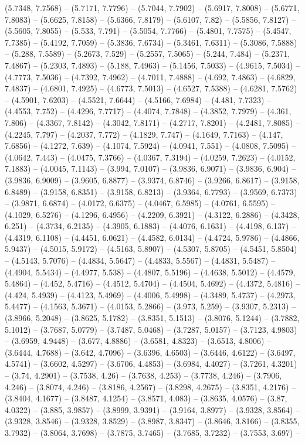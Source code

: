 (5.7348, 7.7568) -- (5.7171, 7.7796) -- (5.7044, 7.7902) -- (5.6917, 7.8008) -- (5.6771, 7.8083) -- (5.6625, 7.8158) -- (5.6366, 7.8179) -- (5.6107, 7.82) -- (5.5856, 7.8127) -- (5.5605, 7.8055) -- (5.533, 7.791) -- (5.5054, 7.7766) -- (5.4801, 7.7575) -- (5.4547, 7.7385) -- (5.4192, 7.7059) -- (5.3836, 7.6734) -- (5.3461, 7.6311) -- (5.3086, 7.5888) -- (5.288, 7.5589) -- (5.2673, 7.529) -- (5.2557, 7.5065) -- (5.244, 7.484) -- (5.2371, 7.4867) -- (5.2303, 7.4893) -- (5.188, 7.4963) -- (5.1456, 7.5033) -- (4.9615, 7.5034) -- (4.7773, 7.5036) -- (4.7392, 7.4962) -- (4.7011, 7.4888) -- (4.692, 7.4863) -- (4.6829, 7.4837) -- (4.6801, 7.4925) -- (4.6773, 7.5013) -- (4.6527, 7.5388) -- (4.6281, 7.5762) -- (4.5901, 7.6203) -- (4.5521, 7.6644) -- (4.5166, 7.6984) -- (4.481, 7.7323) -- (4.4553, 7.752) -- (4.4296, 7.7717) -- (4.4074, 7.7848) -- (4.3852, 7.7979) -- (4.361, 7.806) -- (4.3367, 7.8142) -- (4.3042, 7.8171) -- (4.2717, 7.8201) -- (4.2481, 7.8085) -- (4.2245, 7.797) -- (4.2037, 7.772) -- (4.1829, 7.747) -- (4.1649, 7.7163) -- (4.147, 7.6856) -- (4.1272, 7.639) -- (4.1074, 7.5924) -- (4.0941, 7.551) -- (4.0808, 7.5095) -- (4.0642, 7.443) -- (4.0475, 7.3766) -- (4.0367, 7.3194) -- (4.0259, 7.2623) -- (4.0152, 7.1883) -- (4.0045, 7.1143) -- (3.994, 7.0107) -- (3.9836, 6.9071) -- (3.9836, 6.904) -- (3.9836, 6.9009) -- (3.9605, 6.8877) -- (3.9374, 6.8746) -- (3.9266, 6.8617) -- (3.9158, 6.8489) -- (3.9158, 6.8351) -- (3.9158, 6.8213) -- (3.9364, 6.7793) -- (3.9569, 6.7373) -- (3.9871, 6.6874) -- (4.0172, 6.6375) -- (4.0467, 6.5985) -- (4.0761, 6.5595) -- (4.1029, 6.5276) -- (4.1296, 6.4956) -- (4.2209, 6.3921) -- (4.3122, 6.2886) -- (4.3428, 6.251) -- (4.3734, 6.2135) -- (4.3905, 6.1883) -- (4.4076, 6.1631) -- (4.4198, 6.137) -- (4.4319, 6.1108) -- (4.4451, 6.0621) -- (4.4582, 6.0134) -- (4.4724, 5.9786) -- (4.4866, 5.9437) -- (4.5015, 5.9172) -- (4.5163, 5.8907) -- (4.5307, 5.8705) -- (4.5451, 5.8504) -- (4.5143, 5.7076) -- (4.4834, 5.5647) -- (4.4833, 5.5567) -- (4.4831, 5.5487) -- (4.4904, 5.5434) -- (4.4977, 5.538) -- (4.4807, 5.5196) -- (4.4638, 5.5012) -- (4.4579, 5.4864) -- (4.452, 5.4716) -- (4.4512, 5.4704) -- (4.4504, 5.4692) -- (4.4372, 5.4816) -- (4.424, 5.4939) -- (4.4123, 5.4969) -- (4.4006, 5.4998) -- (4.3489, 5.4737) -- (4.2973, 5.4477) -- (4.1563, 5.3671) -- (4.0153, 5.2866) -- (3.973, 5.259) -- (3.9307, 5.2313) -- (3.8966, 5.2048) -- (3.8625, 5.1782) -- (3.8351, 5.1513) -- (3.8076, 5.1244) -- (3.7882, 5.1012) -- (3.7687, 5.0779) -- (3.7487, 5.0468) -- (3.7287, 5.0157) -- (3.7123, 4.9803) -- (3.6959, 4.9448) -- (3.677, 4.8886) -- (3.6581, 4.8323) -- (3.6513, 4.8006) -- (3.6444, 4.7688) -- (3.642, 4.7096) -- (3.6396, 4.6503) -- (3.6446, 4.6122) -- (3.6497, 4.5741) -- (3.6602, 4.5297) -- (3.6706, 4.4853) -- (3.6984, 4.4027) -- (3.7261, 4.3201) -- (3.74, 4.2901) -- (3.7538, 4.26) -- (3.7638, 4.253) -- (3.7738, 4.246) -- (3.7906, 4.246) -- (3.8074, 4.246) -- (3.8186, 4.2567) -- (3.8298, 4.2675) -- (3.8351, 4.2176) -- (3.8404, 4.1677) -- (3.8487, 4.1254) -- (3.8571, 4.083) -- (3.8635, 4.0576) -- (3.87, 4.0322) -- (3.885, 3.9857) -- (3.8999, 3.9391) -- (3.9164, 3.8977) -- (3.9328, 3.8564) -- (3.9328, 3.8546) -- (3.9328, 3.8529) -- (3.8987, 3.8347) -- (3.8646, 3.8166) -- (3.8355, 3.7932) -- (3.8064, 3.7698) -- (3.7875, 3.7465) -- (3.7685, 3.7232) -- (3.7553, 3.697) -- 